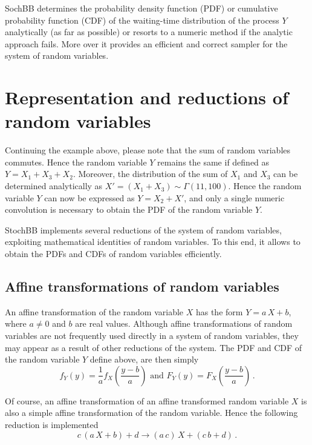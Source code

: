 \documentclass[a4paper, 10pt]{paper}
\begin{document}
SochBB determines the probability density function (PDF) or cumulative probability function
(CDF) of the waiting-time distribution of the process $Y$ analytically (as far as
possible) or resorts to a numeric method if the analytic approach fails. More over it provides an efficient
and correct sampler for the system of random variables.


\section{Representation and reductions of random variables}
Continuing the example above, please note that the sum of random variables commutes. Hence the
random variable $Y$ remains the same if defined as $Y = X_1 + X_3 + X_2$. Moreover, the 
distribution of the sum of $X_1$ and $X_3$ can be determined analytically as 
$X' = (X_1+X_3)\sim\Gamma(11,100)$. Hence the random variable $Y$ can now be expressed as 
$Y = X_2 + X'$, and only a single numeric convolution is necessary to obtain the PDF of the
random variable $Y$. 

StochBB implements several reductions of the system of random variables,
exploiting mathematical identities of random variables. To this end, it allows to obtain the PDFs and CDFs
of random variables efficiently.

\subsection{Affine transformations of random variables}
An affine transformation of the random variable $X$ has the form $Y = a\,X+b$, where $a\neq 0$
and $b$ are real values. Although affine transformations of random variables are not frequently
used directly in a system of random variables, they may appear as a result of other reductions
of the system. The PDF and CDF of the random variable $Y$ define above, are then simply 
\begin{equation}
 f_Y(y) = \frac{1}{a}f_X\left(\frac{y-b}{a}\right)\text{ and }
 F_Y(y) = F_X\left(\frac{y-b}{a}\right)\,. \nonumber
\end{equation}

Of course, an affine transformation of an affine transformed random variable $X$ is also a simple 
affine transformation of the random variable. Hence the following reduction is implemented
\begin{equation}
 c\,(a\,X+b)+d \longrightarrow (a\,c)\,X+(c\,b+d)\,.\nonumber
\end{equation}
\end{document}
